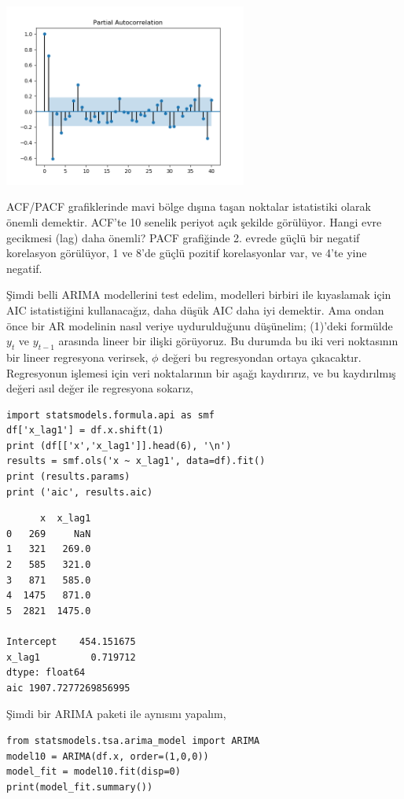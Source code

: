 \documentclass[12pt,fleqn]{article}\usepackage{../../common}
\begin{document}
\includegraphics[height=6cm]{tser_ar_03.png}

ACF/PACF grafiklerinde mavi bölge dışına taşan noktalar istatistiki olarak
önemli demektir. ACF'te 10 senelik periyot açık şekilde görülüyor. Hangi evre
gecikmesi (lag) daha önemli? PACF grafiğinde 2. evrede güçlü bir negatif
korelasyon görülüyor, 1 ve 8'de güçlü pozitif korelasyonlar var, ve 4'te yine
negatif.

Şimdi belli ARIMA modellerini test edelim, modelleri birbiri ile kıyaslamak
için AIC istatistiğini kullanacağız, daha düşük AIC daha iyi demektir. Ama
ondan önce bir AR modelinin nasıl veriye uydurulduğunu düşünelim; (1)'deki
formülde $y_t$ ve $y_{t-1}$ arasında lineer bir ilişki görüyoruz. Bu
durumda bu iki veri noktasının bir lineer regresyona verirsek, $\phi$
değeri bu regresyondan ortaya çıkacaktır. Regresyonun işlemesi için veri
noktalarının bir aşağı kaydırırız, ve bu kaydırılmış değeri asıl değer ile
regresyona sokarız,

\begin{verbatim}
import statsmodels.formula.api as smf
df['x_lag1'] = df.x.shift(1)
print (df[['x','x_lag1']].head(6), '\n')
results = smf.ols('x ~ x_lag1', data=df).fit()
print (results.params)
print ('aic', results.aic)
\end{verbatim}

\begin{verbatim}
      x  x_lag1
0   269     NaN
1   321   269.0
2   585   321.0
3   871   585.0
4  1475   871.0
5  2821  1475.0 

Intercept    454.151675
x_lag1         0.719712
dtype: float64
aic 1907.7277269856995
\end{verbatim}

Şimdi bir ARIMA paketi ile aynısını yapalım,

\begin{verbatim}
from statsmodels.tsa.arima_model import ARIMA
model10 = ARIMA(df.x, order=(1,0,0))
model_fit = model10.fit(disp=0)
print(model_fit.summary())
\end{verbatim}
\end{document}

